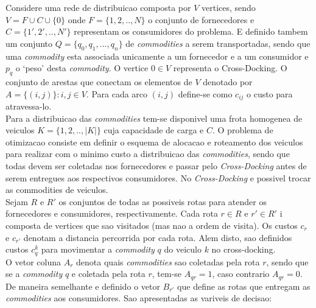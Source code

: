 \documentclass[12pt]{article}
\begin{document}
\noindent Considere uma rede de distribuicao composta por $V$ vertices, sendo $V = F \cup C \cup \{0\}$ onde $F=\{1,2,..,N\}$  o conjunto de fornecedores e $C=\{1',2',..,N'\}$ representam os consumidores do problema. E definido tambem um conjunto $Q = \{q_0, q_1, ..., q_n\}$ de \textit{commodities} a serem transportadas, sendo que uma \textit{commodity} esta associada unicamente a um fornecedor e a um consumidor e $p_q$  o `peso' desta \textit{commodity}. O vertice $0 \in V$ representa o Cross-Docking. O conjunto de arestas que conectam os elementos de $V$  denotado por $A = \{(i,j)\}: i,j \in V$. Para cada arco $(i,j)$ define-se como $c_{ij}$ o custo para atravessa-lo.\\

\noindent Para a distribuicao das \textit{commodities} tem-se disponivel uma frota homogenea de veiculos $K=\{1,2,..,|K|\}$ cuja capacidade de carga e $C$. O problema de otimizacao consiste em definir o esquema de alocacao e roteamento dos veiculos para realizar com o minimo custo a distribuicao das \textit{commodities}, sendo que todas devem ser coletadas nos fornecedores e passar pelo \emph{Cross-Docking} antes de serem entregues aos respectivos consumidores. No \emph{Cross-Docking} e possivel trocar as commodities de veiculos.\\

\noindent Sejam $R$ e $R'$ os conjuntos de todas as possiveis rotas para atender os fornecedores e consumidores, respectivamente. Cada rota $r \in R$ e $r' \in R'$ i composta de vertices que sao visitados (mas nao a ordem de visita). Os custos $c_r$ e $c_{r'}$ denotam a distancia percorrida por cada rota. Alem disto, sao definidos custos $c^k_q$ para movimentar a \textit{commodity} $q$ do veiculo $k$ no cross-docking.\\

\noindent O vetor coluna $A_r$ denota quais \textit{commodities} sao coletadas pela rota $r$, sendo que se a \textit{commodity} $q$ e coletada pela rota $r$, tem-se $A_{qr} = 1$, caso contrario $A_{qr} = 0$. De maneira semelhante e definido o vetor $B_{r'}$ que define as rotas que entregam as \textit{commodities} aos consumidores. Sao apresentadas as variveis de decisao: \\
\end{document}
